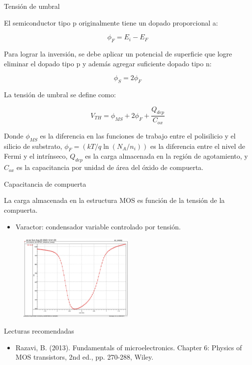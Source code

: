 \documentclass[t,aspectratio=169,10pt]{beamer}
\begin{document}
\begin{frame}{Tensión de umbral}

El semiconductor tipo p originalmente tiene un dopado proporcional a:

    \[ \phi_F = E_i - E_F \]

Para lograr la inversión, se debe aplicar un potencial de superficie que logre eliminar el dopado tipo p y además agregar suficiente dopado tipo n:

    \[ \phi_S = 2\phi_F \]

La tensión de umbral se define como:

    \[ \boxed{ V_{TH} = \phi_{MS} + 2\phi_F + \dfrac{Q_{dep}}{C_{ox}} } \]

Donde $\phi_{MS}$ es la diferencia en las funciones de trabajo entre el polisilicio y el silicio de substrato, $\phi_F = (kT/q \ln (N_A / n_i))$ es la diferencia entre el nivel de Fermi y el intrínseco, $Q_{dep}$ es la carga almacenada en la región de agotamiento, y $C_{ox}$ es la capacitancia por unidad de área del óxido de compuerta.    
\end{frame}


\begin{frame}{Capacitancia de compuerta}

La carga almacenada en la estructura MOS es función de la tensión de la compuerta.

\begin{itemize}
    \item Varactor: condensador variable controlado por tensión.
\end{itemize}

\begin{figure}[H]
    \centering
    \includegraphics[width=0.5\textwidth]{figuras/mosfet_capacitance.png}
\end{figure}
    
\end{frame}


\begin{frame}{Lecturas recomendadas}

\begin{itemize}
    \item Razavi, B. (2013). Fundamentals of microelectronics. Chapter 6: Physics of MOS transistors, 2nd ed., pp. 270-288, Wiley.
\end{itemize}

\end{frame}
\end{document}
